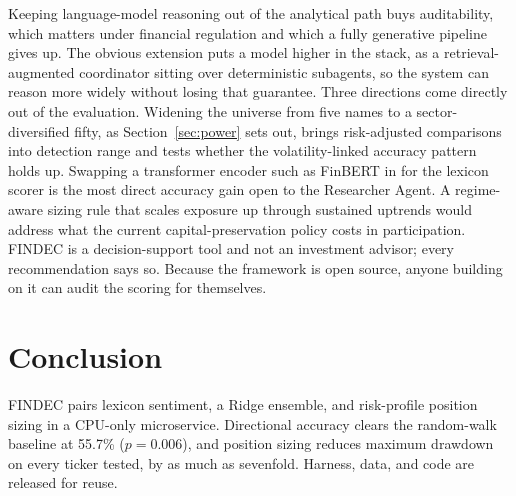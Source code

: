 \documentclass[conference]{IEEEtran}
\begin{document}
Keeping language-model reasoning out of the analytical path buys auditability, which matters under financial regulation and which a fully generative pipeline gives up. The obvious extension puts a model higher in the stack, as a retrieval-augmented coordinator sitting over deterministic subagents, so the system can reason more widely without losing that guarantee. Three directions come directly out of the evaluation. Widening the universe from five names to a sector-diversified fifty, as Section~\ref{sec:power} sets out, brings risk-adjusted comparisons into detection range and tests whether the volatility-linked accuracy pattern holds up. Swapping a transformer encoder such as FinBERT in for the lexicon scorer is the most direct accuracy gain open to the Researcher Agent. A regime-aware sizing rule that scales exposure up through sustained uptrends would address what the current capital-preservation policy costs in participation. FINDEC is a decision-support tool and not an investment advisor; every recommendation says so. Because the framework is open source, anyone building on it can audit the scoring for themselves.

\section{Conclusion}
\label{sec:conclusion}

FINDEC pairs lexicon sentiment, a Ridge ensemble, and risk-profile position sizing in a CPU-only microservice. Directional accuracy clears the random-walk baseline at 55.7\% ($p=0.006$), and position sizing reduces maximum drawdown on every ticker tested, by as much as sevenfold. Harness, data, and code are released for reuse.



\end{document}
